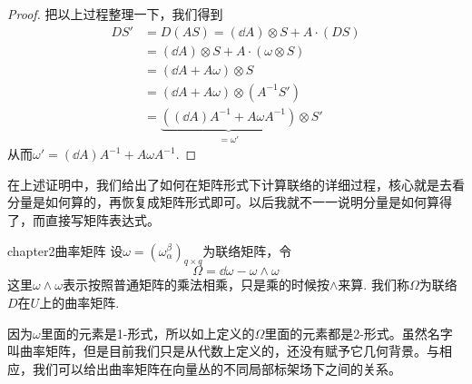 \begin{proof}
	把以上过程整理一下，我们得到	
	\[
	\begin{split}
	DS'&=D(AS)=(\dd A)\otimes S+A\cdot (DS)\\
	&=(\dd A)\otimes S+A\cdot (\omega\otimes S)\\
	&=(\dd A+A\omega )\otimes S\\
	&=(\dd A+A\omega )\otimes (A^{-1}  S')\\
	&=\underbrace{\left((\dd A)  A^{-1}+A   \omega  A^{-1} \right)}_{=\omega'}\otimes S'
	\end{split}
	\]
	从而$\omega'=(\dd A)  A^{-1}+A   \omega  A^{-1} $.
\end{proof}
 
在上述证明中，我们给出了如何在矩阵形式下计算联络的详细过程，核心就是去看分量是如何算的，再恢复成矩阵形式即可。以后我就不一一说明分量是如何算得了，而直接写矩阵表达式。

\begin{mydef}{}{chapter2曲率矩阵}
	设$\omega=(\omega_{\alpha}^{\beta})_{q\times q}$为联络矩阵，令
	\[
	\Omega=\dd \omega-\omega \wedge \omega
	\]
	这里$\omega \wedge \omega$表示按照普通矩阵的乘法相乘，只是乘的时候按$\wedge$来算. 我们称$\Omega$为联络$D$在$U$上的曲率矩阵.
\end{mydef}

因为$\omega$里面的元素是1-形式，所以如上定义的$\Omega$里面的元素都是2-形式。虽然名字叫曲率矩阵，但是目前我们只是从代数上定义的，还没有赋予它几何背景。与相应，我们可以给出曲率矩阵在向量丛的不同局部标架场下之间的关系。

